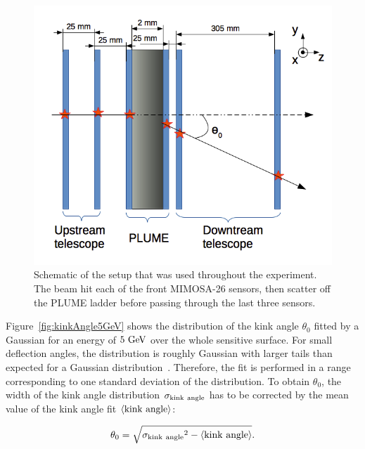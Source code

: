    \begin{figure}[!tbh]
     \centering
     \includegraphics[width = \textwidth]{Pictures/X0/kinkAngle.png}
     \caption{Schematic of the setup that was used throughout the experiment. The beam hit each of the front MIMOSA-26 sensors, then scatter off the PLUME ladder before passing through the last three sensors.}
     \label{fig:kinkAnglePrinciple}
   \end{figure}

   Figure~\ref{fig:kinkAngle5GeV} shows the distribution of the kink angle $\theta_{0}$ fitted by a Gaussian for an energy of $5~\rm{GeV}$ over the whole sensitive surface.
   For small deflection angles, the distribution is roughly Gaussian with larger tails than expected for a Gaussian distribution~\cite{Agashe:2014kda}.
   Therefore, the fit is performed in a range corresponding to one standard deviation of the distribution.
   To obtain $\theta_0$, the width of the kink angle distribution $\rm{\sigma_{kink~angle}}$ has to be corrected by the mean value of the kink angle fit $\langle \rm{kink~angle} \rangle$:
   
   \begin{equation}
     \theta_0 = \sqrt{\rm{\sigma_{kink~angle}}^2 - \langle\rm{kink~angle}\rangle}.
     \label{eq:kink}
   \end{equation}
      
